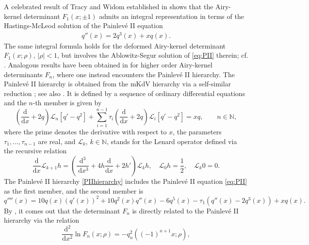 \documentclass[11pt,a4paper]{article}
\numberwithin{equation}{section}
\begin{document}
A celebrated result of Tracy and Widom established in \cite{TW94} shows that the Airy-kernel determinant $F_1(x; \pm 1)$ admits an integral representation in terms of the Hastings-McLeod solution \cite{HM80} of the Painlev\'{e} II equation
\begin{align}\label{eq:PII}
q''(x)=2q^3(x)+xq(x).
\end{align}
The same integral formula holds for the deformed Airy-kernel determinant $F_1(x; \rho)$, $|\rho|<1$, but involves the Ablowitz-Segur solution \cite{AS1976,AS81} of \eqref{eq:PII} therein; cf. \cite{BCP09,BB2018}. Analogous results have been obtained in \cite{CCG2021} for higher order Airy-kernel determinants $F_{n}$, where one instead encounters the Painlev\'{e} II hierarchy. The Painlev\'{e} II hierarchy is obtained from
the mKdV hierarchy via a self-similar reduction \cite{FN}; see also \cite{CJP,Kud02,Maz07}. It is defined by a sequence of ordinary differential equations and the $n$-th member is given by
\begin{equation}\label{PIIhierarchy}
\left(\frac{\mathrm{d}}{\mathrm{d} x}+2 q\right) \mathcal{L}_{n}\left[q'-q^{2}\right]+\sum_{i=1}^{n-1} \tau_{i}\left(\frac{\mathrm{d}}{\mathrm{d} x}+2 q\right) \mathcal{L}_{i}\left[q'-q^{2}\right]=x q, \qquad n\in\mathbb{N},
\end{equation}%
where the prime denotes the derivative with respect to $x$, the parameters $\tau_1,\ldots,\tau_{n-1}$ are real, and $\mathcal{L}_k$, $k\in\mathbb{N}$, stands for the Lenard operator defined via the recursive relation
\begin{equation}\label{recursiverelation}
\frac{\mathrm{d}}{\mathrm{d} x} \mathcal{L}_{k+1} h=\left(\frac{\mathrm{d}^{3}}{\mathrm{~d} x^{3}}+4 h \frac{\mathrm{d}}{\mathrm{d} x}+2 h'\right) \mathcal{L}_{k} h,\quad \mathcal{L}_{0} h=\frac{1}{2}, \quad \mathcal{L}_{k} 0=0.
\end{equation}
The Painlev\'{e} II hierarchy \eqref{PIIhierarchy} includes the Painlev\'{e} II equation \eqref{eq:PII} as the first member, and the second member is
\begin{equation}
q''''(x)=10q(x)(q'(x))^2+10q^2(x)q''(x)-6q^5(x)-\tau_1(q''(x)-2q^3(x))+xq(x). \label{PII2}
\end{equation}
By \cite[Theorem 1.1]{CCG2021}, it comes out that the determinant $F_n$ is directly related to the Painlev\'{e} II hierarchy via the relation
\begin{equation}\label{dF1-expression}
\frac{\mathrm{d}^2}{\mathrm{d}x^2}\ln F_n(x;\rho)=-q_{n}^2\left((-1)^{n+1}x;\rho\right),
\end{equation}
\end{document}
